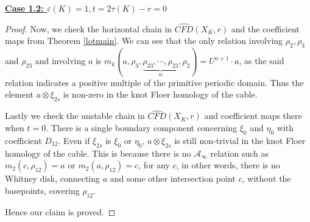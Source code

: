 \documentclass[11pt,reqno]{amsart}
\theoremstyle{definition}
\newtheorem *{remark}{Remark}
\newcommand{\cfdhat}{\widehat{\mathit{CFD}}}
\begin{document}
\begin{subsection}{\underline{\textbf{Case 1.2: $\varepsilon(K)=1, t = 2 \tau(K) - r=0$}}}
\begin{proof}
Now, we check the horizontal chain in $\cfdhat(X_K,r)$ and the coefficient maps from Theorem \ref{lotmain}. We can see that the only relation involving $\rho_2, \rho_3$ and $\rho_{23}$ and involving $a$ is $m_k(a, \rho_3, \underbrace{\rho_{23}, \cdots, \rho_{23}}_{n},\rho_2) = U^{n+1} \cdot a$, as the said relation indicates a positive multiple of the primitive periodic domain. Thus the element $a \otimes \xi_{2s}$ is non-zero in the knot Floer homology of the cable.

Lastly we check the unstable chain in $\cfdhat(X_K,r)$ and coefficient maps there when $t = 0$. There is a single boundary component concerning $\xi_0$ and $\eta_0$ with coefficient $D_{12}$. Even if $\xi_{2s}$ is $\xi_0$ or $\eta_0$, $a \otimes \xi_{2s}$ is still non-trivial in the knot Floer homology of the cable. This is because 
there is no $\mathcal{A}_{\infty}$ relation such as $m_2(c,\rho_{12}) = a$ or $m_2(a,\rho_{12}) = c$, for any $c$, in other words, there is no Whitney disk, connecting $a$ and some other intersection point $c$, without the basepoints, covering $\rho_{12}$. 


Hence our claim is proved.

\end{proof}
\end{subsection}
\end{document}
